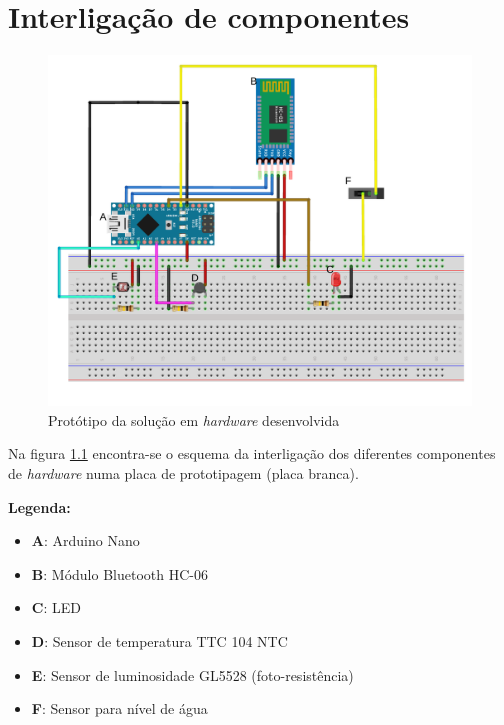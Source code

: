 \chapter{Interligação de componentes}
\label{interlapd}

\begin{figure}[h]
	\centering
	\includegraphics[width=\linewidth]{esquemas/arduino-fritzing/esquema-arduino_bb.pdf}
	\caption{Protótipo da solução em \textit{hardware} desenvolvida}
	\label{hardwaProt}
\end{figure}

Na figura \ref{hardwaProt} encontra-se o esquema da interligação dos diferentes componentes de \textit{hardware} numa placa de prototipagem (placa branca). 


\textbf{Legenda: }

\begin{itemize}
	\item \textbf{A}: Arduino Nano
	\item \textbf{B}: Módulo Bluetooth HC-06
	\item \textbf{C}: \ac{LED}
	\item \textbf{D}: Sensor de temperatura TTC 104 NTC
	\item \textbf{E}: Sensor de luminosidade GL5528 (foto-resistência) 
	\item \textbf{F}: Sensor para nível de água 
\end{itemize}